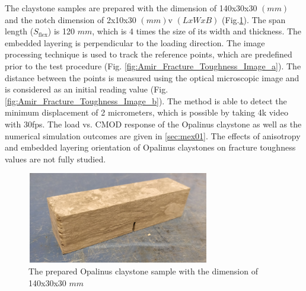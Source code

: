 The claystone samples are prepared with the dimension of 140x30x30 $(mm)$ and the notch dimension of 2x10x30 $(mm)$v $(LxWxB)$  (Fig.\ref{fig:Amir_Fracture_Toughness_Sample}). The span length ($S_\text{flex}$) is 120 $mm$, which is 4 times the size of its width and thickness. The embedded layering is perpendicular to the loading direction. The image processing technique is used to track the reference points, which are predefined prior to the test procedure (Fig. \ref{fig:Amir_Fracture_Toughness_Image_a}). The distance between the points is measured using the optical microscopic image and is considered as an initial reading value (Fig. \ref{fig:Amir_Fracture_Toughness_Image_b}). The method is able to detect the minimum displacement of 2 micrometers, which is possible by taking 4k video with 30fps. The load vs. CMOD response of the Opalinus claystone as well as the numerical simulation outcomes are given in \ref{sec:mex01}. The effects of anisotropy and embedded layering orientation of Opalinus claystones on fracture toughness values are not fully studied. 

\begin{figure}[!ht]
\centering
\includegraphics[width=8cm,height=4cm]{figures/Amir_Fracture_Toughness_Sample.png}
\caption{The prepared Opalinus claystone sample with the dimension of 140x30x30 $mm$}
\label{fig:Amir_Fracture_Toughness_Sample}
\end{figure} 

